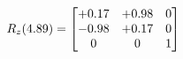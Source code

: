 \documentclass[preview]{standalone}
\begin{document}
\begin{align*}
\special{dvisvgm:raw <g id='unique000'>}R_{z}(4.89) = \begin{bmatrix}+0.17 & +0.98 & 0 \\-0.98 & +0.17 & 0 \\0 & 0 & 1\end{bmatrix}\special{dvisvgm:raw </g>}
\end{align*}
\end{document}

